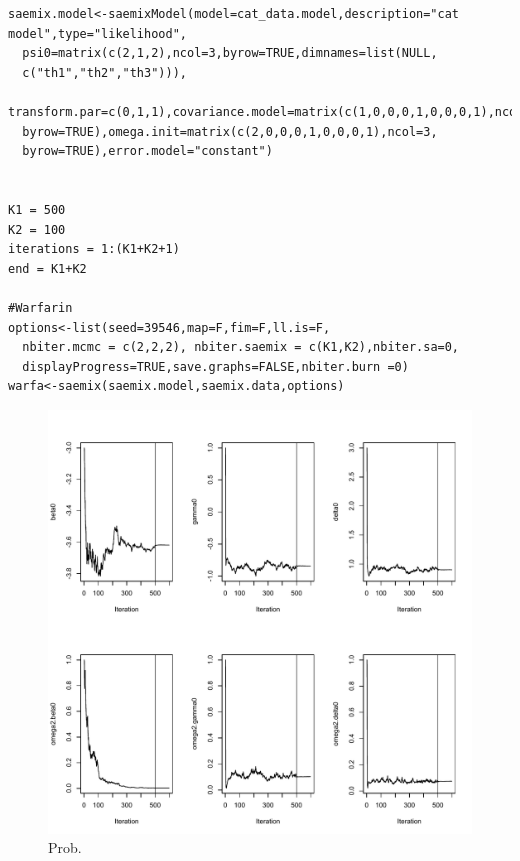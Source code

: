 \begin{lstlisting}
saemix.model<-saemixModel(model=cat_data.model,description="cat model",type="likelihood",   
  psi0=matrix(c(2,1,2),ncol=3,byrow=TRUE,dimnames=list(NULL,   
  c("th1","th2","th3"))), 
  transform.par=c(0,1,1),covariance.model=matrix(c(1,0,0,0,1,0,0,0,1),ncol=3, 
  byrow=TRUE),omega.init=matrix(c(2,0,0,0,1,0,0,0,1),ncol=3, 
  byrow=TRUE),error.model="constant")


K1 = 500
K2 = 100
iterations = 1:(K1+K2+1)
end = K1+K2

#Warfarin
options<-list(seed=39546,map=F,fim=F,ll.is=F,
  nbiter.mcmc = c(2,2,2), nbiter.saemix = c(K1,K2),nbiter.sa=0,
  displayProgress=TRUE,save.graphs=FALSE,nbiter.burn =0)
warfa<-saemix(saemix.model,saemix.data,options)
\end{lstlisting}

\begin{figure}[thp]
\begin{center}
\includegraphics[width=\textwidth]{images/popparam_cat.pdf}
\caption{Prob.}
\label{fig:prob}
\end{center}
\end{figure}